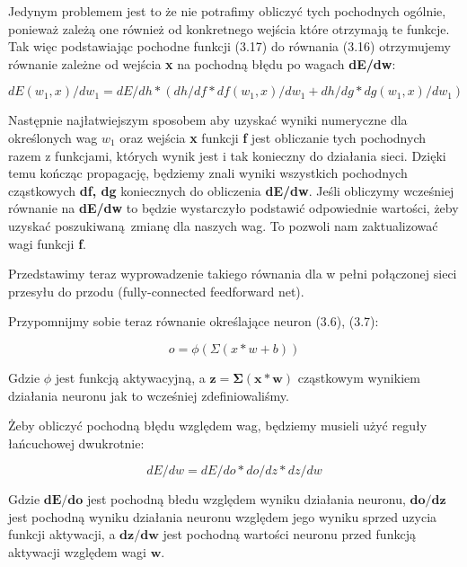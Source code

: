 Jedynym problemem jest to że nie potrafimy obliczyć tych pochodnych ogólnie, ponieważ zależą one również od konkretnego wejścia które otrzymają te funkcje. Tak więc podstawiając pochodne funkcji (3.17) do równania (3.16) otrzymujemy równanie zależne od wejścia \textbf{x} na pochodną błędu po wagach \textbf{dE/dw}:

\begin{equation}
dE(w_1, x)/dw_1 = dE/dh * (dh/df * df(w_1, x)/dw_1 + dh/dg * dg(w_1, x)/dw_1)
\end{equation} 


\noindent Następnie najłatwiejszym sposobem aby uzyskać wyniki numeryczne dla określonych wag \textbf{$w_1$} oraz wejścia \textbf{x} funkcji \textbf{f} jest obliczanie tych pochodnych razem z funkcjami, których wynik jest i tak konieczny do działania sieci. Dzięki temu kończąc propagację, będziemy znali wyniki wszystkich pochodnych cząstkowych \textbf{df, dg} koniecznych do obliczenia \textbf{dE/dw}. Jeśli obliczymy wcześniej równanie na \textbf{dE/dw} to będzie wystarczyło podstawić odpowiednie wartości, żeby uzyskać poszukiwaną zmianę dla naszych wag. To pozwoli nam zaktualizować wagi funkcji \textbf{f}.\newline

\noindent Przedstawimy teraz wyprowadzenie takiego równania dla w pełni połączonej sieci przesyłu do przodu (fully-connected feedforward net).\newline

\noindent Przypomnijmy sobie teraz równanie określające neuron (3.6), (3.7):

\begin{equation}
o = \phi(\Sigma(x * w + b))
\end{equation}

\noindent Gdzie \textbf{$\phi$} jest funkcją aktywacyjną, a $\boldsymbol{z = \Sigma(x * w)}$ cząstkowym wynikiem działania neuronu jak to wcześniej zdefiniowaliśmy.\newline

Żeby obliczyć pochodną błędu względem wag, będziemy musieli użyć reguły łańcuchowej dwukrotnie:

\begin{equation}
dE/dw = dE/do * do/dz * dz/dw
\end{equation}

\noindent Gdzie $\boldsymbol{dE/do}$ jest pochodną błedu względem wyniku działania neuronu, $\boldsymbol{do/dz}$ jest pochodną wyniku działania neuronu względem jego wyniku sprzed uzycia funkcji aktywacji, a $\boldsymbol{dz/dw}$ jest pochodną wartości neuronu przed funkcją aktywacji względem wagi $\boldsymbol{w}$.\newline

